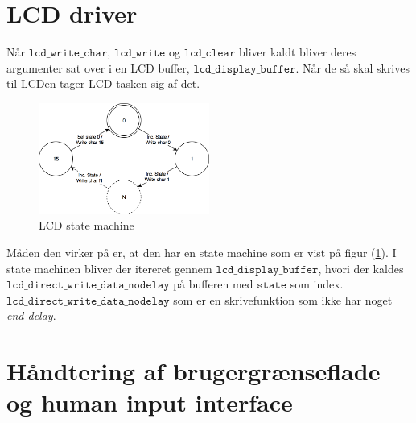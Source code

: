 \section{LCD driver}
Når $\mathtt{lcd\_write\_char}$, $\mathtt{lcd\_write}$ og $\mathtt{lcd\_clear}$ bliver kaldt bliver deres argumenter sat over i en LCD buffer, $\mathtt{lcd\_display\_buffer}$.
Når de så skal skrives til LCDen tager LCD tasken sig af det.
\begin{figure}[!ht]
	\centering
	\includegraphics[width=0.5\textwidth]{billeder/lcd_state_machine.png}
	\caption{LCD state machine}
	\label{fig:LCD_state_machine}
\end{figure}
\newline
Måden den virker på er, at den har en state machine som er vist på figur (\ref{fig:LCD_state_machine}).\newline
I state machinen bliver der itereret gennem $\mathtt{lcd\_display\_buffer}$, hvori der kaldes $\mathtt{lcd\_direct\_write\_data\_nodelay}$ på bufferen med $\mathtt{state}$ som index.\newline
$\mathtt{lcd\_direct\_write\_data\_nodelay}$ som er en skrivefunktion som ikke har noget \textit{end delay}.

\section{Håndtering af brugergrænseflade og human input interface}


